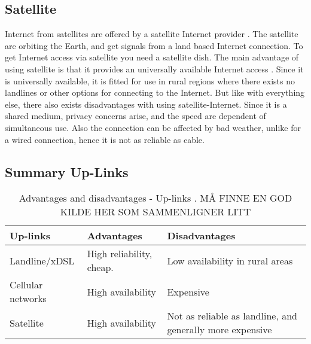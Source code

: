 \subsection{Satellite}
Internet from satellites are offered by a satellite Internet provider \cite{cablevssatellite}. The satellite are orbiting the Earth, and get signals from a land based Internet connection. To get Internet access via satellite you need a satellite dish. The main advantage of using satellite is that it provides an universally available Internet access \cite{broadband}. Since it is universally available, it is fitted for use in rural regions where there exists no landlines or other options for connecting to the Internet. But like with everything else, there also exists disadvantages with using satellite-Internet. Since it is a shared medium, privacy concerns arise, and the speed are dependent of simultaneous use. Also the connection can be affected by bad weather, unlike for a wired connection, hence it is not as reliable as cable. 

\subsection{Summary Up-Links}

\begin{center}
\begin{table}[!ht]
\caption{\label{tab:uplinks}Advantages and disadvantages - Up-links \cite{}. MÅ FINNE EN GOD KILDE HER SOM SAMMENLIGNER LITT}
    \begin{tabular}{ | l | p{4cm} | p{5cm} |}
    \hline
    \textbf{Up-links} & \textbf{Advantages} & \textbf{Disadvantages} \\ 
    \hline
    Landline/xDSL & High reliability, cheap. & Low availability in rural areas \\ 
    \hline
     Cellular networks & High availability & Expensive\\
    \hline
    Satellite & High availability  & Not as reliable as landline, and generally more expensive \\ 
    \hline
    \end{tabular}
   \end{table}
\end{center}

